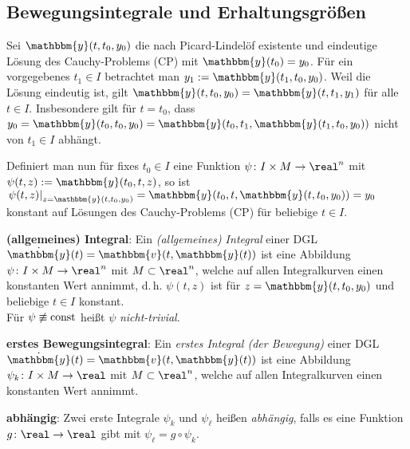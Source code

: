 \pagebreak

\subsection{%
    Bewegungsintegrale und Erhaltungsgrößen%
}

Sei $\mathbbm{y}(t, t_0, y_0)$ die nach Picard-Lindelöf existente und
eindeutige Lösung des Cauchy-Problems (CP) mit $\mathbbm{y}(t_0) = y_0$.
Für ein vorgegebenes $t_1 \in I$ betrachtet man
$y_1 := \mathbbm{y}(t_1, t_0, y_0)$.
Weil die Lösung eindeutig ist, gilt
$\mathbbm{y}(t, t_0, y_0) = \mathbbm{y}(t, t_1, y_1)$ für alle $t \in I$.
Insbesondere gilt für $t = t_0$, dass
$y_0 = \mathbbm{y}(t_0, t_0, y_0) =
\mathbbm{y}(t_0, t_1, \mathbbm{y}(t_1, t_0, y_0))$
nicht von $t_1 \in I$ abhängt.

Definiert man nun für fixes $t_0 \in I$
eine Funktion $\psi\colon I \times M \rightarrow \real^n$
mit $\psi(t, z) := \mathbbm{y}(t_0, t, z)$, so ist
$\left.\psi(t, z)\right|_{z = \mathbbm{y}(t, t_0, y_0)} =
\mathbbm{y}(t_0, t, \mathbbm{y}(t, t_0, y_0)) = y_0$ konstant
auf Lösungen des Cauchy-Problems (CP) für beliebige $t \in I$.

\textbf{(allgemeines) Integral}:
Ein \emph{(allgemeines) Integral} einer DGL
$\dot{\mathbbm{y}}(t) = \mathbbm{v}(t, \mathbbm{y}(t))$ ist eine
Abbildung $\psi\colon I \times M \rightarrow \real^n$ mit $M \subset \real^n$,
welche auf allen Integralkurven einen konstanten Wert annimmt, d.\,h.
$\psi(t, z)$ ist für $z = \mathbbm{y}(t, t_0, y_0)$ und beliebige
$t \in I$ konstant. \\
Für $\psi \not\equiv \operatorname{const}$ heißt $\psi$ \emph{nicht-trivial}.

\textbf{erstes Bewegungsintegral}:
Ein \emph{erstes Integral (der Bewegung)} einer DGL
$\dot{\mathbbm{y}}(t) = \mathbbm{v}(t, \mathbbm{y}(t))$ ist eine
Abbildung $\psi_k\colon I \times M \rightarrow \real$ mit $M \subset \real^n$,
welche auf allen Integralkurven einen konstanten Wert annimmt.

\textbf{abhängig}:
Zwei erste Integrale $\psi_k$ und $\psi_\ell$ heißen \emph{abhängig},
falls es eine Funktion $g\colon \real \rightarrow \real$ gibt mit
$\psi_\ell = g \circ \psi_k$.

